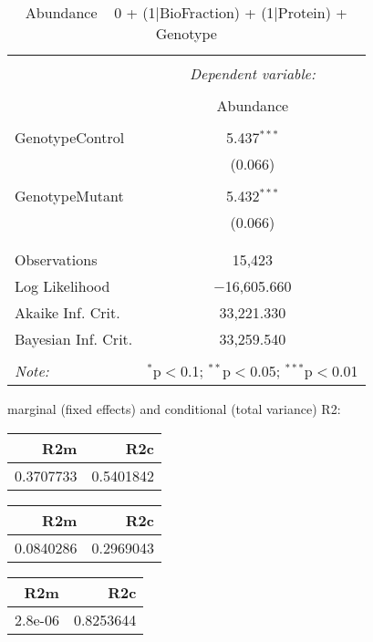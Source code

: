 \documentclass[11pt]{report}
\begin{document}
\begin{table}[!htbp] \centering 
  \caption{Abundance ~ 0 + (1|BioFraction) + (1|Protein) + Genotype} 
  \label{} 
\begin{tabular}{@{\extracolsep{5pt}}lc} 
\\[-1.8ex]\hline 
\hline \\[-1.8ex] 
 & \multicolumn{1}{c}{\textit{Dependent variable:}} \\ 
\cline{2-2} 
\\[-1.8ex] & Abundance \\ 
\hline \\[-1.8ex] 
 GenotypeControl & 5.437$^{***}$ \\ 
  & (0.066) \\ 
  & \\ 
 GenotypeMutant & 5.432$^{***}$ \\ 
  & (0.066) \\ 
  & \\ 
\hline \\[-1.8ex] 
Observations & 15,423 \\ 
Log Likelihood & $-$16,605.660 \\ 
Akaike Inf. Crit. & 33,221.330 \\ 
Bayesian Inf. Crit. & 33,259.540 \\ 
\hline 
\hline \\[-1.8ex] 
\textit{Note:}  & \multicolumn{1}{r}{$^{*}$p$<$0.1; $^{**}$p$<$0.05; $^{***}$p$<$0.01} \\ 
\end{tabular} 
\end{table} 
marginal (fixed effects) and conditional (total variance) R2:

\begin{tabular}{r|r}
\hline
R2m & R2c\\
\hline
0.3707733 & 0.5401842\\
\hline
\end{tabular}

\begin{tabular}{r|r}
\hline
R2m & R2c\\
\hline
0.0840286 & 0.2969043\\
\hline
\end{tabular}

\begin{tabular}{r|r}
\hline
R2m & R2c\\
\hline
2.8e-06 & 0.8253644\\
\hline
\end{tabular}
\end{document}
